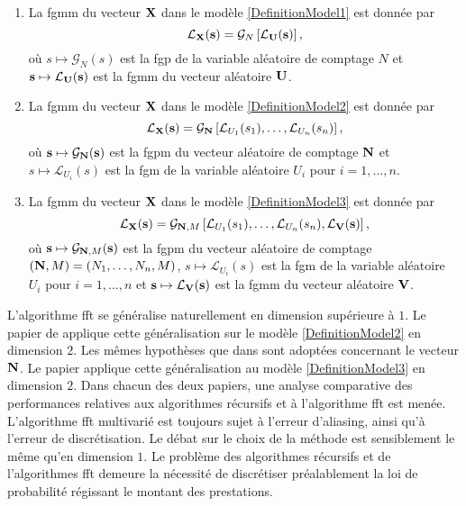 \begin{Prop}
\begin{enumerate}
\item La \gls{fgmm} du vecteur $\bold{X}$ dans le modèle \ref{DefinitionModel1} est donnée par
\begin{equation}\label{MultivariateMultivariateMomentGeneratingFunctionRV1}
\mathcal{L}_{\bold{X}}(\bold{s})=\mathcal{G}_{N}\left[\mathcal{L}_{\bold{U}}(\bold{s})\right],
\end{equation}
où $s\mapsto\mathcal{G}_{N}(s)$ est la \gls{fgp} de la variable aléatoire de comptage $N$ et $\bold{s}\mapsto\mathcal{L}_{\bold{U}}(\bold{s})$ est la \gls{fgmm} du vecteur aléatoire $\bold{U}$. 
\item La \gls{fgmm} du vecteur $\bold{X}$ dans le modèle \ref{DefinitionModel2} est donnée par
\begin{equation}\label{MultivariateMultivariateMomentGeneratingFunctionRV2}
\mathcal{L}_{\bold{X}}(\bold{s})=\mathcal{G}_{\bold{N}}\left[\mathcal{L}_{U_{1}}(s_{1}),\ldots,\mathcal{L}_{U_{n}}(s_{n})\right],
\end{equation}
où $\bold{s}\mapsto\mathcal{G}_{\bold{N}}(\bold{s})$ est la \gls{fgpm} du vecteur aléatoire de comptage $\bold{N}$ et $s\mapsto\mathcal{L}_{U_{i}}(s)$ est la \gls{fgm} de la variable aléatoire $U_{i}$ pour $i=1,\ldots,n$. 
\item La \gls{fgmm} du vecteur $\bold{X}$ dans le modèle \ref{DefinitionModel3} est donnée par
\begin{equation}\label{MultivariateMultivariateMomentGeneratingFunctionRV3}
\mathcal{L}_{\bold{X}}(\bold{s})=\mathcal{G}_{\bold{N},M}\left[\mathcal{L}_{U_{1}}(s_{1}),\ldots,\mathcal{L}_{U_{n}}(s_{n}),\mathcal{L}_{\bold{V}}(\bold{s})\right],
\end{equation}
où $\bold{s}\mapsto\mathcal{G}_{\bold{N},M}(\bold{s})$ est la \gls{fgpm} du vecteur aléatoire de comptage $(\bold{N},M)=(N_{1},\ldots,N_{n},M)$, $s\mapsto\mathcal{L}_{U_{i}}(s)$ est la \gls{fgm} de la variable aléatoire $U_{i}$ pour $i=1,\ldots,n$ et $\bold{s}\mapsto\mathcal{L}_{\bold{V}}(\bold{s})$ est la \gls{fgmm} du vecteur aléatoire $\bold{V}$.
\end{enumerate}
\end{Prop}

L'algorithme \gls{fft} se généralise naturellement en dimension supérieure à $1$. Le papier de \citet{JiRe10} applique cette généralisation sur le modèle \ref{DefinitionModel2} en dimension $2$. Les mêmes hypothèses que dans \citet{He96} sont adoptées concernant le vecteur $\bold{N}$. Le papier \citet{JiRe14} applique cette généralisation au modèle \ref{DefinitionModel3} en dimension $2$. Dans chacun des deux papiers, une analyse comparative des performances relatives aux algorithmes récursifs et à l'algorithme \gls{fft} est menée. L'algorithme \gls{fft} multivarié est toujours sujet à l'erreur d'aliasing, ainsi qu'à l'erreur de discrétisation. Le débat sur le choix de la méthode est sensiblement le même qu'en dimension $1$. Le problème des algorithmes récursifs et de l'algorithmes \gls{fft} demeure la nécessité de discrétiser préalablement la loi de probabilité régissant le montant des prestations.\\

